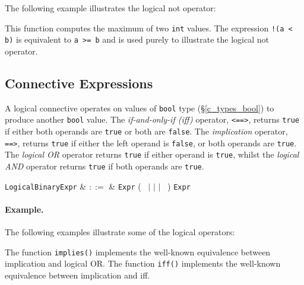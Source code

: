 The following example illustrates the logical not operator:



This function computes the maximum of two \lstinline{int} values.  The expression \lstinline{!(a < b)} is equivalent to \lstinline{a >= b} and is used purely to illustrate the logical not operator.


\subsection{Connective Expressions}
\label{c_expr_logical_connectives}

A logical connective operates on values of \lstinline{bool} type (\S\ref{c_types_bool}) to produce another \lstinline{bool} value.  The {\em if-and-only-if (iff)} operator, \lstinline{<==>}, returns \lstinline{true} if either both operands are \lstinline{true} or both are \lstinline{false}.  The {\em implication} operator, \lstinline{==>}, returns \lstinline{true} if either the left operand is \lstinline{false}, or both operands are \lstinline{true}.  The {\em logical OR} operator returns \lstinline{true} if either operand is \lstinline{true}, whilst the {\em logical AND} operator returns \lstinline{true} if both operands are \lstinline{true}.

\begin{syntax}

  \verb+LogicalBinaryExpr+ & $::=$ & \verb+Expr+ \big(\ \token{<==>} $|$ \token{==>} $|$ \token{\&\&} $|$ \token{||}\ \big) \verb+Expr+\\
\end{syntax}

\paragraph{Example.}  The following examples illustrate some of the logical operators:



The function \lstinline{implies()} implements the well-known equivalence between implication and logical OR.  The function \lstinline{iff()} implements the well-known equivalence between implication and iff.

